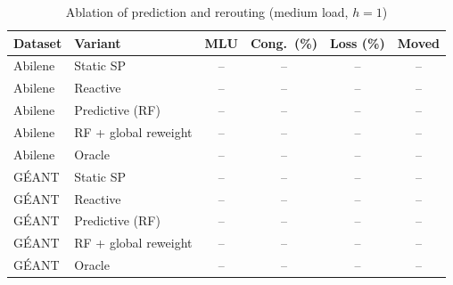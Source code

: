 \begin{table}[t]
\centering
\caption{Ablation of prediction and rerouting (medium load, $h=1$)}
\label{tab:abl_route}
\scriptsize
\begin{tabular}{@{}llcccc@{}}
\toprule
Dataset & Variant & MLU & Cong.\ (\%) & Loss (\%) & Moved \\
\midrule
Abilene & Static SP & -- & -- & -- & -- \\
Abilene & Reactive & -- & -- & -- & -- \\
Abilene & Predictive (RF) & -- & -- & -- & -- \\
Abilene & RF + global reweight & -- & -- & -- & -- \\
Abilene & Oracle & -- & -- & -- & -- \\
G\'EANT & Static SP & -- & -- & -- & -- \\
G\'EANT & Reactive & -- & -- & -- & -- \\
G\'EANT & Predictive (RF) & -- & -- & -- & -- \\
G\'EANT & RF + global reweight & -- & -- & -- & -- \\
G\'EANT & Oracle & -- & -- & -- & -- \\
\bottomrule
\end{tabular}
\end{table}
